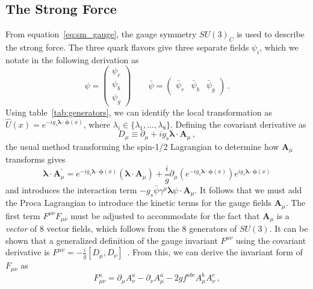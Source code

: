 \subsection{The Strong Force} \label{sec:sm_theory_strong}
From equation~\ref{eq:sm_gauge}, the gauge symmetry $SU(3)_C$ is used to describe the strong force. The three quark flavors give three separate fields $\psi_i$, which we notate in the following derivation as
\begin{equation}
	\psi=\begin{pmatrix}\psi_r\\ \psi_b \\ \psi_g\end{pmatrix} \qquad \bar{\psi}=\begin{pmatrix}\bar{\psi}_r & \bar{\psi}_b & \bar{\psi}_g\end{pmatrix}\,.
\end{equation}
Using table~\ref{tab:generators}, we can identify the local transformation as $\hat{U}(x)=e^{-ig_s\boldsymbol{\lambda}\cdot\boldsymbol{\phi}(x)}$, where $\lambda_i\in\{\lambda_1,...,\lambda_8\}$. Defining the covariant derivative as
\begin{equation}
	D_\mu\equiv\partial_\mu+ig_s\boldsymbol{\lambda}\cdot \mathbf{A}_\mu\,,
\end{equation}
the usual method transforming the spin-1/2 Lagrangian to determine how $\mathbf{A}_\mu$ transforms gives
\begin{equation}
	\boldsymbol{\lambda}\cdot\mathbf{A}^\prime_\mu=e^{-ig_s\boldsymbol{\lambda}\cdot\boldsymbol{\phi}(x)}\left(\boldsymbol{\lambda}\cdot\mathbf{A}_\mu\right)+\frac{i}{g}\partial_\mu\left(e^{-ig_s\boldsymbol{\lambda}\cdot\boldsymbol{\phi}(x)}\right)e^{ig_s\boldsymbol{\lambda}\cdot\boldsymbol{\phi}(x)}
\end{equation}
and introduces the interaction term $-g_s\bar{\psi}\gamma^\mu\boldsymbol{\lambda}\psi\cdot\mathbf{A}_\mu$. It follows that we must add the Proca Lagrangian to introduce the kinetic terms for the gauge fields $\mathbf{A}_\mu$. The first term $F^{\mu\nu}F_{\mu\nu}$ must be adjusted to accommodate for the fact that $\mathbf{A}_\mu$ is a \textit{vector} of 8 vector fields, which follows from the 8 generators of $SU(3)$. It can be shown that a generalized definition of the gauge invariant $F^{\mu\nu}$ using the covariant derivative is $F^{\mu\nu}=-\frac{i}{g}[D_\mu,D_\nu]$~\cite{flournoy}. From this, we can derive the invariant form of $F_{\mu\nu}$ as
\begin{equation}
	\label{eq:qcd_fmunu}
	F_{\mu\nu}^a=\partial_\mu A^a_\nu-\partial_\nu A^a_\mu-2gf^{abc}A^b_\mu A^c_\nu\,,
\end{equation}
